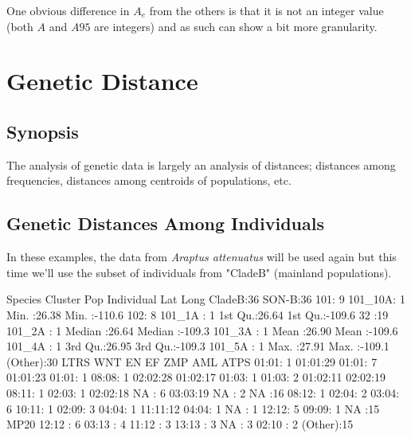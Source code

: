 \documentclass[letterpaper,twoside,openany]{book}
\begin{document}
One obvious difference in $A_e$ from the others is that it is not an integer value (both $A$ and $A95$ are integers) and as such can show a bit more granularity.

\chapter{Genetic Distance}

\section{Synopsis}

The analysis of genetic data is largely an analysis of distances; distances among frequencies, distances among centroids of populations, etc.

\section{Genetic Distances Among Individuals}

In these examples, the data from \emph{Araptus attenuatus} will be used again but this time we'll use the subset of individuals from "CladeB" (mainland populations).

\begin{Schunk}
\begin{Soutput}
   Species    Cluster    Pop       Individual      Lat             Long       
 CladeB:36   SON-B:36   101: 9   101_10A: 1   Min.   :26.38   Min.   :-110.6  
                        102: 8   101_1A : 1   1st Qu.:26.64   1st Qu.:-109.6  
                        32 :19   101_2A : 1   Median :26.64   Median :-109.3  
                                 101_3A : 1   Mean   :26.90   Mean   :-109.6  
                                 101_4A : 1   3rd Qu.:26.95   3rd Qu.:-109.3  
                                 101_5A : 1   Max.   :27.91   Max.   :-109.1  
                                 (Other):30                                   
    LTRS       WNT         EN         EF        ZMP        AML        ATPS   
 01:01: 1   01:01:29   01:01: 7   01:01:23   01:01: 1   08:08: 1   02:02:28  
 01:02:17   01:03: 1   01:03: 2   01:02:11   02:02:19   08:11: 1   02:03: 1  
 02:02:18   NA   : 6   03:03:19   NA   : 2   NA   :16   08:12: 1   02:04: 2  
                       03:04: 6                         10:11: 1   02:09: 3  
                       04:04: 1                         11:11:12   04:04: 1  
                       NA   : 1                         12:12: 5   09:09: 1  
                                                        NA   :15             
      MP20   
 12:12  : 6  
 03:13  : 4  
 11:12  : 3  
 13:13  : 3  
 NA     : 3  
 02:10  : 2  
 (Other):15  
\end{Soutput}
\end{Schunk}
\end{document}
